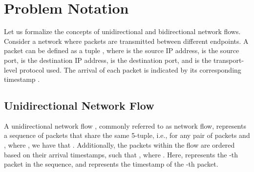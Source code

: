 \documentclass[lettersize,journal]{IEEEtran}
\begin{document}
{
    \small
    
     
}



\appendices
\section{Problem Notation}\label{sec:prob_notation}

Let us formalize the concepts of unidirectional and bidirectional network flows. Consider a network where packets are transmitted between different endpoints. A packet  can be defined as a tuple , where  is the source IP address,  is the source port,  is the destination IP address,  is the destination port, and  is the transport-level protocol used. The arrival of each packet is indicated by its corresponding timestamp .

\subsection{Unidirectional Network Flow}
A unidirectional network flow , commonly referred to as network flow, represents a sequence of  packets that share the same 5-tuple, i.e., for any pair of packets  and , where , we have that . Additionally, the packets within the flow are ordered based on their arrival timestamps, such that , where . Here,  represents the -th packet in the sequence, and  represents the timestamp of the -th packet. 
\end{document}
